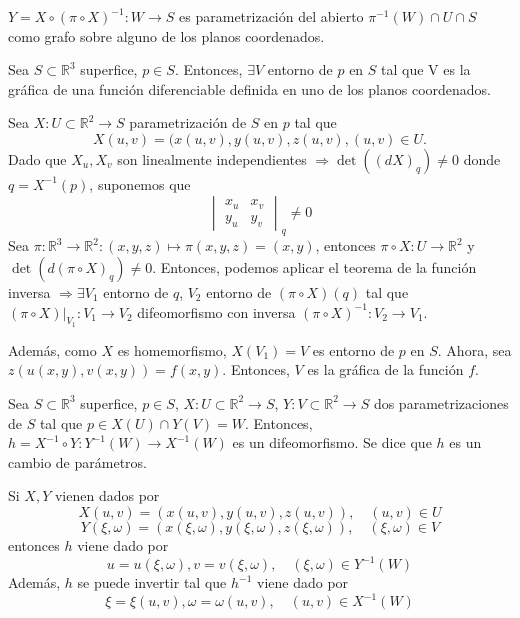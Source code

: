 \begin{obs}
  $Y = X \circ ( \pi \circ X)^{-1} : W \to S$ es parametrización del abierto $\pi^{-1}(W)\cap U \cap S$ como grafo sobre alguno de los planos coordenados.
\end{obs}

\begin{prop}
  Sea $S \subset \mathbb{R}^{3}$ superfice, $p \in S$. Entonces, $\exists V$ entorno de $p$ en $S$ tal que V es la gráfica de una función diferenciable definida en uno de los planos coordenados.
\end{prop}

\begin{dem}
  Sea $X : U \subset \mathbb{R}^{2} \to S$ parametrización de $S$ en $p$ tal que
  \[
    X(u, v) = (x(u, v), y(u, v), z(u, v), (u, v) \in U.
  \]
  Dado que $X_{u}, X_{v}$ son linealmente independientes $ \Rightarrow \det((d X)_{q}) \neq 0$ donde $ q = X^{-1}(p)$, suponemos que
  \[ 
    \begin{vmatrix}
     x_{u} & x_{v} \\
     y_{u} & y_{v}
    \end{vmatrix}
    _{q}
    \neq 0
  \]
  Sea $\pi : \mathbb{R}^{3} \to \mathbb{R}^{2} : (x,y,z) \mapsto \pi(x,y,z) = (x,y)$, entonces $\pi \circ X : U \to \mathbb{R}^{2}$ y $\det(d (\pi \circ X)_{q}) \neq 0$. Entonces, podemos aplicar el teorema de la función inversa $\Rightarrow \exists V_{1}$ entorno de $q$, $V_{2}$ entorno de $(\pi \circ X)(q)$ tal que $(\pi \circ X)|_{V_{1}} : V_{1} \to V_{2}$ difeomorfismo con inversa $(\pi \circ X)^{-1} : V_{2} \to V_{1}$.

  Además, como $X$ es homemorfismo, $X(V_{1}) = V$ es entorno de $p$ en $S$. Ahora, sea $z(u(x,y),v(x,y)) = f(x,y)$. Entonces, $V$ es la gráfica de la función $f$.
\end{dem}

\begin{prop}
  Sea $S \subset \mathbb{R}^{3}$ superfice, $p \in S$, $X: U \subset \mathbb{R}^{2} \to S$, $Y: V \subset \mathbb{R}^{2} \to S$ dos parametrizaciones de $S$ tal que $p \in X(U) \cap Y(V) = W$. Entonces, $h = X^{-1} \circ Y: Y^{-1}(W) \to X^{-1}(W)$ es un difeomorfismo. Se dice que $h$ es un cambio de parámetros.
\end{prop}

\begin{obs}
  Si $X, Y$ vienen dados por
  \[ 
    X(u, v) = (x(u, v), y(u, v), z(u, v)), \quad (u,v)\in U
  \] 
    \[ 
    Y(\xi, \omega ) = (x(\xi, \omega ), y(\xi, \omega ), z(\xi, \omega )), \quad (\xi, \omega ) \in V
  \] 
  entonces $h$ viene dado por
  \[ 
    u = u(\xi, \omega), v=v(\xi, \omega), \quad (\xi, \omega ) \in Y^{-1}(W) 
  \] 
  Además, $h$ se puede invertir tal que $h^{-1}$ viene dado por
  \[ 
    \xi = \xi(u,v), \omega = \omega(u,v), \quad (u,v) \in X^{-1}(W)
  \] 
\end{obs}

